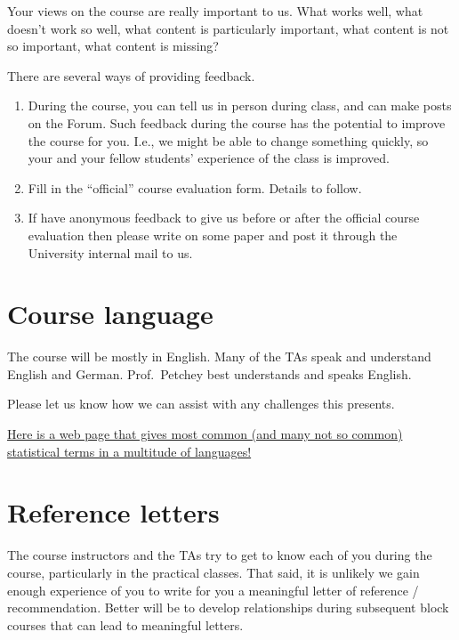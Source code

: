 \documentclass[
  letterpaper,
  8pt,
  a4paper]{book}
\providecommand{\tightlist}{%
  \setlength{\itemsep}{0pt}\setlength{\parskip}{0pt}}
\begin{document}
Your views on the course are really important to us. What works well,
what doesn't work so well, what content is particularly important, what
content is not so important, what content is missing?

There are several ways of providing feedback.

\begin{enumerate}
\def\labelenumi{\arabic{enumi}.}
\tightlist
\item
  During the course, you can tell us in person during class, and can
  make posts on the Forum. Such feedback during the course has the
  potential to improve the course for you. I.e., we might be able to
  change something quickly, so your and your fellow students' experience
  of the class is improved.
\item
  Fill in the ``official'' course evaluation form. Details to follow.
\item
  If have anonymous feedback to give us before or after the official
  course evaluation then please write on some paper and post it through
  the University internal mail to us.
\end{enumerate}

\section*{Course language}\label{course-language}


The course will be mostly in English. Many of the TAs speak and
understand English and German. Prof.~Petchey best understands and speaks
English.

Please let us know how we can assist with any challenges this presents.

\href{http://isi.cbs.nl/glossary/index.htm}{Here is a web page that
gives most common (and many not so common) statistical terms in a
multitude of languages!}

\section*{Reference letters}\label{reference-letters}


The course instructors and the TAs try to get to know each of you during
the course, particularly in the practical classes. That said, it is
unlikely we gain enough experience of you to write for you a meaningful
letter of reference / recommendation. Better will be to develop
relationships during subsequent block courses that can lead to
meaningful letters.
\end{document}
